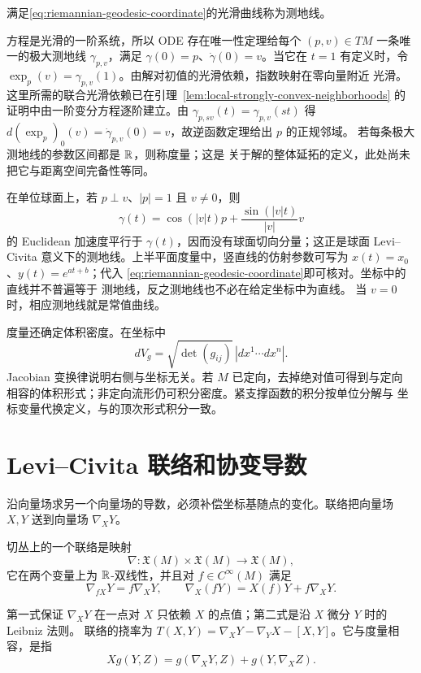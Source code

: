 \begin{definition}
满足\eqref{eq:riemannian-geodesic-coordinate}的光滑曲线称为测地线。
\end{definition}

方程是光滑的一阶系统，所以 ODE 存在唯一性定理给每个
$(p,v)\in TM$ 一条唯一的极大测地线 $\gamma_{p,v}$，满足
$\gamma(0)=p$、$\dot\gamma(0)=v$。当它在 $t=1$ 有定义时，令
$\exp_p(v)=\gamma_{p,v}(1)$。由解对初值的光滑依赖，指数映射在零向量附近
光滑。
这里所需的联合光滑依赖已在引理~\ref{lem:local-strongly-convex-neighborhoods}
的证明中由一阶变分方程逐阶建立。由 $\gamma_{p,sv}(t)=\gamma_{p,v}(st)$ 得
$d(\exp_p)_0(v)=\dot\gamma_{p,v}(0)=v$，故逆函数定理给出 $p$ 的正规邻域。
若每条极大测地线的参数区间都是 $\mathbb{R}$，则称度量；这是
关于解的整体延拓的定义，此处尚未把它与距离空间完备性等同。

在单位球面上，若 $p\perp v$、$|p|=1$ 且 $v\ne0$，则
\[
 \gamma(t)=\cos(|v|t)p+\frac{\sin(|v|t)}{|v|}v
\]
的 Euclidean 加速度平行于 $\gamma(t)$，因而没有球面切向分量；这正是球面
Levi--Civita 意义下的测地线。上半平面度量中，竖直线的仿射参数可写为
$x(t)=x_0$、$y(t)=e^{at+b}$；代入
\eqref{eq:riemannian-geodesic-coordinate}即可核对。坐标中的直线并不普遍等于
测地线，反之测地线也不必在给定坐标中为直线。
当 $v=0$ 时，相应测地线就是常值曲线。

度量还确定体积密度。在坐标中
\begin{equation}\label{eq:riemannian-volume-density}
 dV_g=\sqrt{\det(g_{ij})}\,|dx^1\cdots dx^n|.
\end{equation}
Jacobian 变换律说明右侧与坐标无关。若 $M$ 已定向，去掉绝对值可得到与定向
相容的体积形式；非定向流形仍可积分密度。紧支撑函数的积分按单位分解与
坐标变量代换定义，与的顶次形式积分一致。

\section{Levi--Civita 联络和协变导数}

沿向量场求另一个向量场的导数，必须补偿坐标基随点的变化。联络把向量场
$X,Y$ 送到向量场 $\nabla_XY$。
\begin{definition}
切丛上的一个联络是映射
\[
 \nabla:\mathfrak X(M)\times\mathfrak X(M)\longrightarrow\mathfrak X(M),
\]
它在两个变量上为 $\mathbb{R}$-双线性，并且对 $f\in C^\infty(M)$ 满足
\[
 \nabla_{fX}Y=f\nabla_XY,
 \qquad
 \nabla_X(fY)=X(f)Y+f\nabla_XY.
\]
\end{definition}
第一式保证 $\nabla_XY$ 在一点对 $X$ 只依赖 $X$ 的点值；第二式是沿 $X$
微分 $Y$ 时的 Leibniz 法则。
联络的挠率为 $T(X,Y)=\nabla_XY-\nabla_YX-[X,Y]$。它与度量相容，是指
\begin{equation}\label{eq:metric-compatible-connection}
 Xg(Y,Z)=g(\nabla_XY,Z)+g(Y,\nabla_XZ).
\end{equation}


